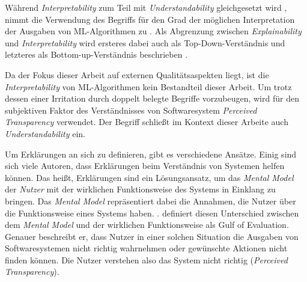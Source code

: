 Während \textit{Interpretability} zum Teil mit \textit{Understandability} gleichgesetzt wird \cite{chazette_end-users_nodate}, nimmt die Verwendung des Begriffs für den Grad der möglichen Interpretation der Ausgaben von ML-Algorithmen zu \cite{doshi2017towards}. Als Abgrenzung zwischen \textit{Explainability} und \textit{Interpretability} wird ersteres dabei auch als \glqq Top-Down\grqq{}-Verständnis und letzteres als \glqq Bottom-up\grqq{}-Verständnis beschrieben \cite{thomson_knowledge--information_2020}.

Da der Fokus dieser Arbeit auf externen Qualitätsaspekten liegt, ist die \textit{Interpretability} von ML-Algorithmen kein Bestandteil dieser Arbeit. Um trotz dessen einer Irritation durch doppelt belegte Begriffe vorzubeugen, wird für den subjektiven Faktor des Verständnisses von Softwaresystem \textit{Perceived Transparency} verwendet. Der Begriff schließt im Kontext dieser Arbeite auch \textit{Understandability} ein.

\bigskip

Um Erklärungen an sich zu definieren, gibt es verschiedene Ansätze. Einig sind sich viele Autoren, dass Erklärungen beim Verständnis von Systemen helfen können. Das heißt, Erklärungen sind ein Lösungsansatz, um das \textit{Mental Model} der \textit{Nutzer} mit der wirklichen Funktionsweise des Systems in Einklang zu bringen. Das \textit{Mental Model} repräsentiert dabei die Annahmen, die Nutzer über die Funktionsweise eines Systems haben. \cite{chi_three_nodate}. \citeauthor{norman1988psychology} definiert diesen Unterschied zwischen dem \textit{Mental Model} und der wirklichen Funktionsweise als \glqq Gulf of Evaluation\grqq \cite{norman1988psychology}. Genauer beschreibt er, dass Nutzer in einer solchen Situation die Ausgaben von Softwaresystemen nicht richtig wahrnehmen oder gewünschte Aktionen nicht finden können. Die Nutzer verstehen also das System nicht richtig (\textit{Perceived Transparency}).

